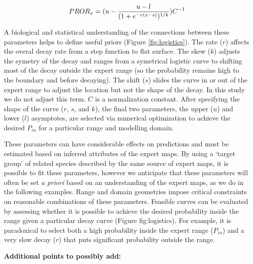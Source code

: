 \begin{equation}
PROR_x = (u - { u-l \over (1 + e^{-r(x - s)})^{1 / k} })C^{-1}
\end{equation}


A biological and statistical understanding of the connections between these parameters helps to define useful priors (Figure \ref{fig:logistics}). The rate ($r$) affects the overal decay rate from a step function to flat surface. The skew ($k$) adjusts the symetry of the decay and ranges from a symetrical logistic curve to shifting most of the decay outside the expert range (so the probability remains high to the boundary and before decaying).  The  shift ($s$) slides the curve in or out of the expert range to adjust the location but not the shape of the decay.  In this study we do not adjust this term.  $C$ is a normalization constant.   After specifying the shape of the curve ($r$, $s$, and $k$), the final two parameters, the upper ($u$) and lower ($l$) asymptotes, are selected via numerical optimization to achieve the desired $P_{in}$ for a particular range and modelling domain. 


These parameters can have considerable effects on predictions and must be estimated based on inferred attributes of the expert maps. By using a `target group' of related species described by the same source of expert maps, it is possible to fit these parameters, however we anticipate that these parameters will often be set \emph{a priori} based on an understanding of the expert maps, as we do in the following examples.  Range and domain geometries impose critical constraints on reasonable combinations of these parameters. Feasible curves can be evaluated by assessing whether it is possible to achieve the desired probability inside the range given a particular decay curve (Figure fig:logistics).  For example, it is paradoxical to select both a high probability inside the expert range ($P_{in}$) and a very slow decay ($r$) that puts significant probability outside the range.   


\textbf{Additional points to possibly add:} 

